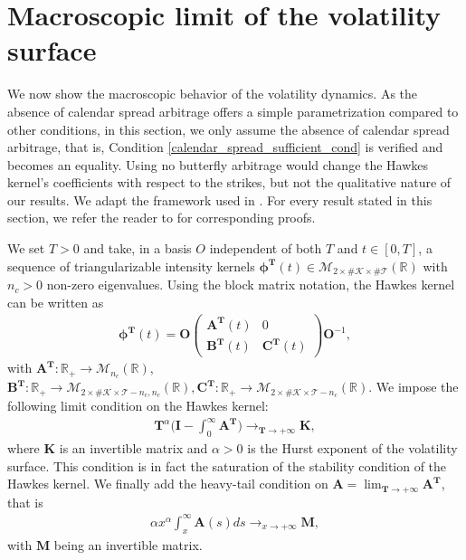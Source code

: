 \documentclass[12pt]{article}
\begin{document}
\section{Macroscopic limit of the volatility surface}\label{sec_macro_volatility}

We now show the macroscopic behavior of the volatility dynamics. As the absence of calendar spread arbitrage offers a simple parametrization compared to other conditions, in this section, we only assume the absence of calendar spread arbitrage, that is, Condition \eqref{calendar_spread_sufficient_cond} is verified and becomes an equality. Using no butterfly arbitrage would change the Hawkes kernel's coefficients with respect to the strikes, but not the qualitative nature of our results. We adapt the framework used in \cite{tomas2019microscopic}. For every result stated in this section, we refer the reader to \cite{tomas2019microscopic} for corresponding proofs. \medskip

We set $T>0$ and take, in a basis $O$ independent of both $T$ and $t\in[0,T]$, a sequence of triangularizable intensity kernels $\boldsymbol{\phi}^{\mathbf{T}}(t) \in \mathcal{M}_{2\times\#\mathcal{K}\times\#\mathcal{T}}(\mathbb{R})$ with $n_c>0$ non-zero eigenvalues. Using the block matrix notation, the Hawkes kernel can be written as
\begin{align*}
   \boldsymbol{\phi}^{\mathbf{T}}(t) = \mathbf{O} 
   \begin{pmatrix}
    \mathbf{A}^{\mathbf{T}}(t) & 0 \\
    \mathbf{B}^{\mathbf{T}}(t) & \mathbf{C}^{\mathbf{T}}(t)
   \end{pmatrix}
   \mathbf{O}^{-1},
\end{align*}
with $\mathbf{A}^{\mathbf{T}}: \mathbb{R}_+ \rightarrow \mathcal{M}_{n_c}(\mathbb{R})$, $\mathbf{B}^{\mathbf{T}}: \mathbb{R}_+ \rightarrow \mathcal{M}_{2\times\#\mathcal{K}\times\mathcal{T}-n_c,n_c}(\mathbb{R}),\mathbf{C}^{\mathbf{T}}: \mathbb{R}_+ \rightarrow \mathcal{M}_{2\times\#\mathcal{K}\times\mathcal{T}-n_c}(\mathbb{R})$. We impose the following limit condition on the Hawkes kernel:
\begin{align*}
    \mathbf{T}^\alpha \big(\mathbf{I} -\int_0^\infty \mathbf{A}^{\mathbf{T}} \big) \rightarrow_{\mathbf T \rightarrow+\infty} \mathbf{K},
\end{align*}
where $\mathbf{K}$ is an invertible matrix and $\alpha>0$ is the Hurst exponent of the volatility surface. This condition is in fact the saturation of the stability condition of the Hawkes kernel. We finally add the heavy-tail condition on $\mathbf A=\lim_{\mathbf T \rightarrow +\infty} \mathbf{A}^{\mathbf{T}}$, that is
\begin{align*}
    \alpha x^\alpha\int_x^\infty \mathbf A(s) ds \rightarrow_{x\rightarrow +\infty} \mathbf{M},
\end{align*}
with $\mathbf{M}$ being an invertible matrix. \medskip
\end{document}
